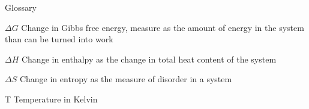 
\begin{dictionary}{Glossary}
\item[$\Delta G$] Change in Gibbs free energy, measure as the amount of energy in the system than can be turned into work
\item[$\Delta H$] Change in enthalpy as the change in total heat content of the system
\item[$\Delta S$] Change in entropy as the measure of disorder in a system
\item[T] Temperature in Kelvin
\end{dictionary}
